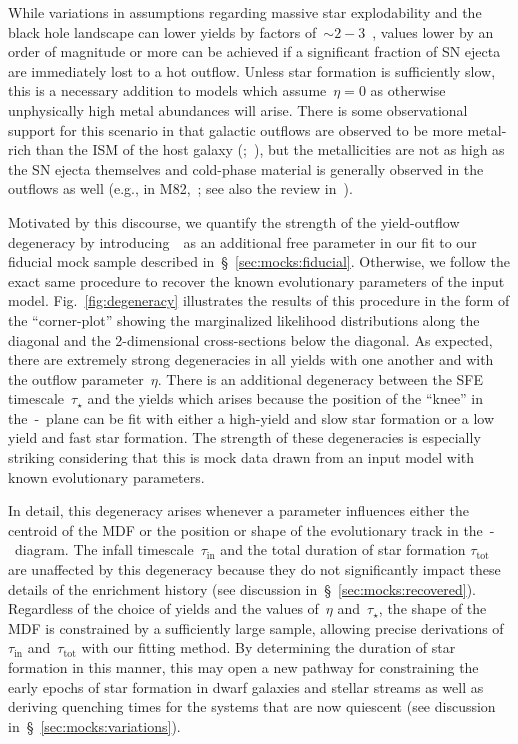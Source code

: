 \documentclass[ms.tex]{subfiles}
\begin{document}
While variations in assumptions regarding massive star explodability and the
black hole landscape can lower yields by factors
of~$\sim2 - 3$~\citep{Griffith2021}, values lower by an order of magnitude or
more can be achieved if a significant fraction of SN ejecta are immediately
lost to a hot outflow.
Unless star formation is sufficiently slow, this is a necessary addition to
models which assume~$\eta = 0$ as otherwise unphysically high metal abundances
will arise.
There is some observational support for this scenario in that galactic outflows
are observed to be more metal-rich than the ISM of the host galaxy
(\citealp*{Chisholm2018};~\citealp{Cameron2021}), but the metallicities are
not as high as the SN ejecta themselves and cold-phase material is generally
observed in the outflows as well (e.g., in M82,~\citealp{Lopez2020}; see also
the review in~\citealt{Veilleux2020}).
\par
Motivated by this discourse, we quantify the strength of the yield-outflow
degeneracy by introducing~\yacc~as an additional free parameter in our fit to
our fiducial mock sample described in~\S~\ref{sec:mocks:fiducial}.
Otherwise, we follow the exact same procedure to recover the known evolutionary
parameters of the input model.
Fig.~\ref{fig:degeneracy} illustrates the results of this procedure in the
form of the ``corner-plot'' showing the marginalized likelihood distributions
along the diagonal and the 2-dimensional cross-sections below the diagonal.
As expected, there are extremely strong degeneracies in all yields with one
another and with the outflow parameter~$\eta$.
There is an additional degeneracy between the SFE timescale~$\tau_\star$ and
the yields which arises because the position of the ``knee'' in
the~\afe-\feh~plane can be fit with either a high-yield and slow star formation
or a low yield and fast star formation.
The strength of these degeneracies is especially striking considering that this
is mock data drawn from an input model with known evolutionary parameters.
\par
In detail, this degeneracy arises whenever a parameter influences either the
centroid of the MDF or the position or shape of the evolutionary track in
the~\afe-\feh~diagram.
The infall timescale~$\tau_\text{in}$ and the total duration of star formation
$\tau_\text{tot}$ are unaffected by this degeneracy because they do not
significantly impact these details of the enrichment history (see discussion
in~\S~\ref{sec:mocks:recovered}).
Regardless of the choice of yields and the values of~$\eta$ and~$\tau_\star$,
the shape of the MDF is constrained by a sufficiently large sample, allowing
precise derivations of~$\tau_\text{in}$ and~$\tau_\text{tot}$ with our fitting
method.
By determining the duration of star formation in this manner, this may open a
new pathway for constraining the early epochs of star formation in dwarf
galaxies and stellar streams as well as deriving quenching times for the
systems that are now quiescent (see discussion
in~\S~\ref{sec:mocks:variations}).
\end{document}

